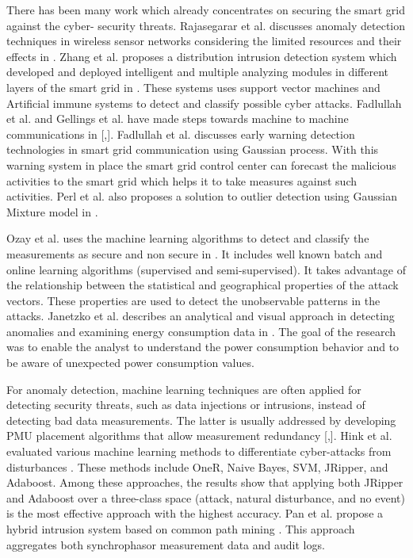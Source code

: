 \frenchspacing There has been many work which already concentrates on securing the smart grid against the cyber- security threats. Rajasegarar et al. discusses anomaly detection techniques in wireless sensor networks considering the limited resources and their effects in \cite{rajasegarar2008anomaly}. Zhang et al. proposes a distribution intrusion detection system which developed and deployed intelligent and multiple analyzing modules in different layers of the smart grid in \cite{zhang2011distributed}. These systems uses support vector machines and Artificial immune systems to detect and classify possible cyber attacks. Fadlullah et al. and Gellings et al. have made steps towards machine to machine communications in [\cite{fadlullah2011early},\cite{gellings2009smart}]. Fadlullah et al. discusses early warning detection technologies in smart grid communication using Gaussian process. With this warning system in place the smart grid control center can forecast the malicious activities to the smart grid which helps it to take measures against such activities. Perl et al. also proposes a solution to outlier detection using Gaussian Mixture model in \cite{perl2009outlier}. 

Ozay et al. uses the machine learning algorithms to detect and classify the measurements as secure and non secure in \cite{ozay2015machine}. It includes well known batch and online learning algorithms (supervised and semi-supervised). It takes advantage of the relationship between the statistical and geographical properties of the attack vectors. These properties are used to detect the unobservable patterns in the attacks. Janetzko et al. describes an analytical and visual approach in detecting anomalies and examining energy consumption data in \cite{janetzko2014anomaly}. The goal of the research was to enable the analyst to understand the power consumption behavior and to be aware of unexpected power consumption values. 

For anomaly detection, machine learning techniques are often applied for detecting security threats, such as data injections or intrusions, instead of detecting bad data measurements. The latter is usually addressed by developing PMU placement algorithms that allow measurement redundancy [\cite{chen2006placement},\cite{tarali2012bad}]. Hink et al. evaluated various machine learning methods to differentiate cyber-attacks from disturbances \cite{hink2014machine}. These methods include OneR, Naive Bayes, SVM, JRipper, and Adaboost. Among these approaches, the results show that applying both JRipper and Adaboost over a three-class space (attack, natural disturbance, and no event) is the most effective approach with the highest accuracy. Pan et al. propose a hybrid intrusion system based on common path mining \cite{pan2015developing}. This approach aggregates both synchrophasor measurement data and audit logs. 


